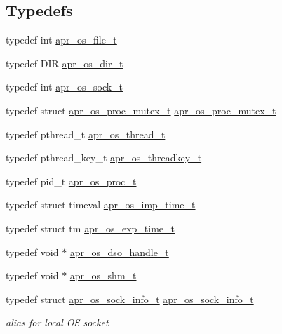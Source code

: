 \subsection*{Typedefs}
\begin{DoxyCompactItemize}
\item 
typedef int \hyperlink{group__apr__portabile_ga885491b889a4a719549650d3a370fd34}{apr\-\_\-os\-\_\-file\-\_\-t}
\item 
typedef D\-I\-R \hyperlink{group__apr__portabile_gacb790646cfc3da1b43a5f7c4bfaa3937}{apr\-\_\-os\-\_\-dir\-\_\-t}
\item 
typedef int \hyperlink{group__apr__portabile_ga2965cd2e48cb6513bc0ba05aa6083ed7}{apr\-\_\-os\-\_\-sock\-\_\-t}
\item 
typedef struct \hyperlink{structapr__os__proc__mutex__t}{apr\-\_\-os\-\_\-proc\-\_\-mutex\-\_\-t} \hyperlink{group__apr__portabile_ga107413a26e947456cabfcab99b8a7ade}{apr\-\_\-os\-\_\-proc\-\_\-mutex\-\_\-t}
\item 
typedef pthread\-\_\-t \hyperlink{group__apr__portabile_ga4ccd9519af148ccf9cff850dd58f00b6}{apr\-\_\-os\-\_\-thread\-\_\-t}
\item 
typedef pthread\-\_\-key\-\_\-t \hyperlink{group__apr__portabile_ga0a228496d8a1a9b3be744ddb101a3e76}{apr\-\_\-os\-\_\-threadkey\-\_\-t}
\item 
typedef pid\-\_\-t \hyperlink{group__apr__portabile_ga2ce5962de629ee6528081813c6b60e2e}{apr\-\_\-os\-\_\-proc\-\_\-t}
\item 
typedef struct timeval \hyperlink{group__apr__portabile_ga6d27e476300cd1d3fda24e1ff0e358e1}{apr\-\_\-os\-\_\-imp\-\_\-time\-\_\-t}
\item 
typedef struct tm \hyperlink{group__apr__portabile_ga0fa9349212690591b09a0cbea7b61bdd}{apr\-\_\-os\-\_\-exp\-\_\-time\-\_\-t}
\item 
typedef void $\ast$ \hyperlink{group__apr__portabile_ga542684803ee8ab0abd69077697599ec0}{apr\-\_\-os\-\_\-dso\-\_\-handle\-\_\-t}
\item 
typedef void $\ast$ \hyperlink{group__apr__portabile_ga7af1085d6390fbd08d66482b8c17de51}{apr\-\_\-os\-\_\-shm\-\_\-t}
\item 
\hypertarget{group__apr__portabile_gaece2b8b41cbb949590896b47daaa9fd2}{typedef struct \hyperlink{structapr__os__sock__info__t}{apr\-\_\-os\-\_\-sock\-\_\-info\-\_\-t} \hyperlink{group__apr__portabile_gaece2b8b41cbb949590896b47daaa9fd2}{apr\-\_\-os\-\_\-sock\-\_\-info\-\_\-t}}\label{group__apr__portabile_gaece2b8b41cbb949590896b47daaa9fd2}

\begin{DoxyCompactList}\small\item\em alias for local O\-S socket \end{DoxyCompactList}\end{DoxyCompactItemize}
